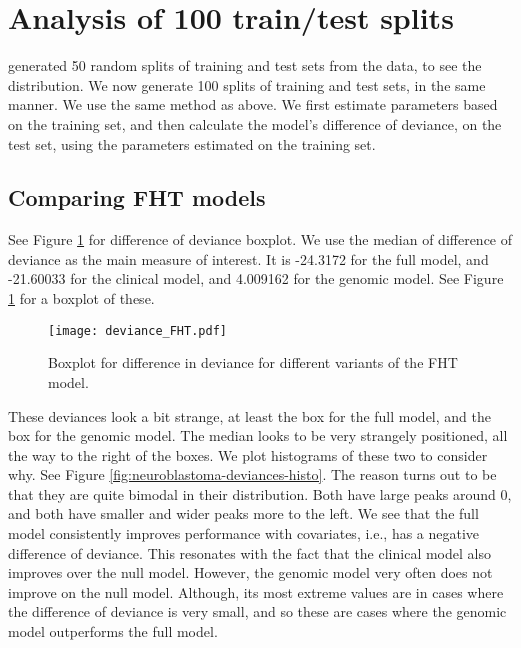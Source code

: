 


\section{Analysis of 100 train/test splits}
\citet{bovelstad2009} generated 50 random splits of training and test sets from the data, to see the distribution.
We now generate 100 splits of training and test sets, in the same manner.
We use the same method as above.
We first estimate parameters based on the training set, and then calculate the model's difference of deviance, on the test set, using the parameters estimated on the training set.

\subsection{Comparing FHT models}
See Figure \ref{fig:neuroblastoma-deviances} for difference of deviance boxplot.
We use the median of difference of deviance as the main measure of interest.
It is -24.3172 for the full model, and -21.60033 for the clinical model, and 4.009162 for the genomic model.
See Figure \ref{fig:neuroblastoma-deviances} for a boxplot of these.

\begin{figure}
\caption{Boxplot for difference in deviance for different variants of the FHT model.}
\label{fig:neuroblastoma-deviances}
\centering
\texttt{[image: deviance\_FHT.pdf]}
\end{figure}

These deviances look a bit strange, at least the box for the full model, and the box for the genomic model.
The median looks to be very strangely positioned, all the way to the right of the boxes.
We plot histograms of these two to consider why.
See Figure \ref {fig:neuroblastoma-deviances-histo}.
The reason turns out to be that they are quite bimodal in their distribution.
Both have large peaks around 0, and both have smaller and wider peaks more to the left.
We see that the full model consistently improves performance with covariates, i.e., has a negative difference of deviance.
This resonates with the fact that the clinical model also improves over the null model.
However, the genomic model very often does not improve on the null model.
Although, its most extreme values are in cases where the difference of deviance is very small, and so these are cases where the genomic model outperforms the full model.

